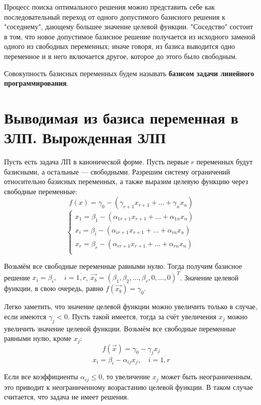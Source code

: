 \documentclass[17pt]{extarticle}
\begin{document}
Процесс поиска оптимального решения можно представить себе как последовательный переход от одного допустимого базисного решения к "соседнему", дающему большее значение целевой функции. "Соседство" состоит в том, что новое допустимое базисное решение получается из исходного заменой одного из свободных переменных; иначе говоря, из базиса выводится одно переменное и в него включается другое, которое до этого было свободным.

Совокупность базисных переменных будем называть \textbf{базисом задачи линейного программирования}.




\section{Выводимая из базиса переменная в ЗЛП. Вырожденная ЗЛП}

Пусть есть задача ЛП в канонической форме. Пусть первые \( r \) переменных будут базисными, а остальные — свободными. Разрешим систему ограничений относительно базисных переменных, а также выразим целевую функцию через свободные переменные:
\[
    f(x) = \gamma_0 - (\gamma_{r+1}x_{r+1} + \dots + \gamma_n x_n)
\]
\[
    \begin{cases}
        x_1 = \beta_1 - (\alpha_{1 r+1}x_{r+1} + \dots + \alpha_{1n}x_n) \\
        x_i = \beta_i - (\alpha_{i r+1}x_{r+1} + \dots + \alpha_{in}x_n) \\
        x_r = \beta_r - (\alpha_{r r+1}x_{r+1} + \dots + \alpha_{rn}x_n) \\
    \end{cases}
\]

Возьмём все свободные переменные равными нулю. Тогда получим базисное решение \( x_i = \beta_i, \quad i = \overline{1,r} \), \( \vec{x_b} = (\beta_1, \beta_2, \dots, \beta_r, 0, \dots, 0)^T \). Значение целевой функции, в свою очередь, равно \( f(\vec{x_b}) = \gamma_0 \).

Легко заметить, что значение целевой функции можно увеличить только в случае, если имеются \( \gamma_j < 0 \). Пусть такой имеется, тогда за счёт увеличения \( x_j \) можно увеличить значение целевой функции. Возьмём все свободные переменные равными нулю, кроме \( x_j \):
\[
    f(\vec{x}) = \gamma_0 - \gamma_j x_j
\]
\[
    x_i = \beta_i - \alpha_{ij} x_j, \quad i = \overline{1,r}
\]

Если все коэффициенты \( \alpha_{ij} \le 0 \), то увеличение \( x_j \) может быть неограниченным, это приводит к неограниченному возрастанию целевой функции. В таком случае считается, что задача не имеет решения.
\end{document}

